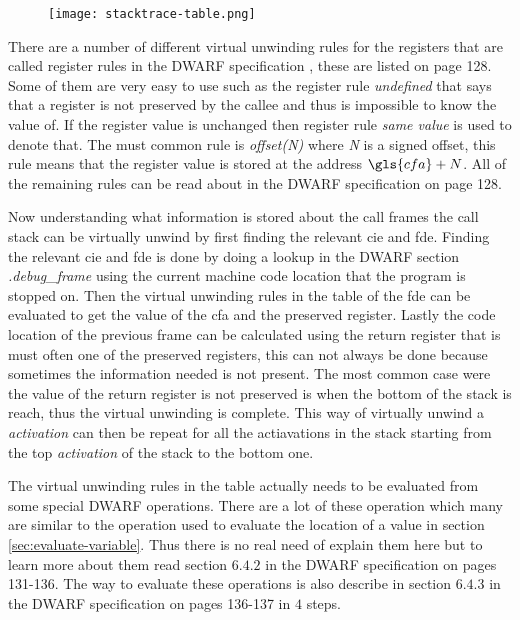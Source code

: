 \begin{figure}[h]
    \centering
    \texttt{[image: stacktrace-table.png]}
    \label{fig:stacktracetable}
\end{figure}


There are a number of different virtual unwinding rules for the registers that are called register rules in the \gls{DWARF} specification \cite{dwarf}, these are listed on page 128.
Some of them are very easy to use such as the register rule \emph{undefined} that says that a register is not preserved by the callee and thus is impossible to know the value of.
If the register value is unchanged then register rule \emph{same value} is used to denote that.
The must common rule is \emph{offset(N)} where \emph{N} is a signed offset, this rule means that the register value is stored at the address $\gls{cfa}+N$.
All of the remaining rules can be read about in the \gls{DWARF} specification \cite{dwarf} on page 128.


Now understanding what information is stored about the call frames the call stack can be virtually unwind by first finding the relevant \gls{cie} and \gls{fde}.
Finding the relevant \gls{cie} and \gls{fde} is done by doing a lookup in the \gls{DWARF} section \emph{.debug\_frame} using the current machine code location that the program is stopped on.
Then the virtual unwinding rules in the table of the \gls{fde} can be evaluated to get the value of the \gls{cfa} and the preserved register.
Lastly the code location of the previous frame can be calculated using the return register that is must often one of the preserved registers, this can not always be done because sometimes the information needed is not present.
The most common case were the value of the return register is not preserved is when the bottom of the stack is reach, thus the virtual unwinding is complete.
This way of virtually unwind a \emph{activation} can then be repeat for all the actiavations in the stack starting from the top \emph{activation} of the stack to the bottom one.


The virtual unwinding rules in the table actually needs to be evaluated from some special \gls{DWARF} operations.
There are a lot of these operation which many are similar to the operation used to evaluate the location of a value in section \ref{sec:evaluate-variable}.
Thus there is no real need of explain them here but to learn more about them read section $6.4.2$ in the \gls{DWARF} specification \cite{dwarf} on pages 131-136.
The way to evaluate these operations is also describe in section $6.4.3$ in the \gls{DWARF} specification \cite{dwarf} on pages 136-137 in $4$ steps.

